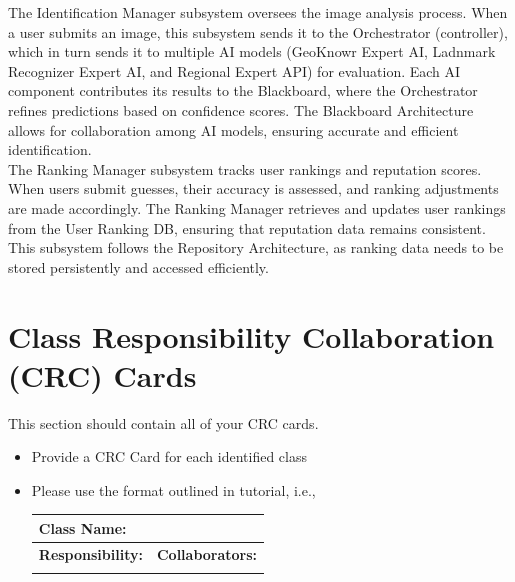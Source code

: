 \documentclass[]{article}
\begin{document}
\noindent The Identification Manager subsystem oversees the image analysis process. When a user submits an image, this subsystem sends it to the Orchestrator (controller), which in turn sends it to multiple AI models (GeoKnowr Expert AI, Ladnmark Recognizer Expert AI, and Regional Expert API) for evaluation. Each AI component contributes its results to the Blackboard, where the Orchestrator refines predictions based on confidence scores. The Blackboard Architecture allows for collaboration among AI models, ensuring accurate and efficient identification. \\

\noindent The Ranking Manager subsystem tracks user rankings and reputation scores. When users submit guesses, their accuracy is assessed, and ranking adjustments are made accordingly. The Ranking Manager retrieves and updates user rankings from the User Ranking DB, ensuring that reputation data remains consistent. This subsystem follows the Repository Architecture, as ranking data needs to be stored persistently and accessed efficiently.

	
\section{Class Responsibility Collaboration (CRC) Cards}
\label{sec:class_responsibility_collaboration_crc_cards}
This section should contain all of your CRC cards.

\begin{itemize}
	\item Provide a CRC Card for each identified class
	\item Please use the format outlined in tutorial, i.e.,
	\begin{table}[ht]
		\centering
		\begin{tabular}{|p{5cm}|p{5cm}|}
		\hline 
		 \multicolumn{2}{|l|}{\textbf{Class Name:}} \\
		\hline
		\textbf{Responsibility:} & \textbf{Collaborators:} \\
		\hline
		\vspace{1in} & \\
		\hline
		\end{tabular}
	\end{table}
	
\end{itemize}

\appendix
\end{document}
